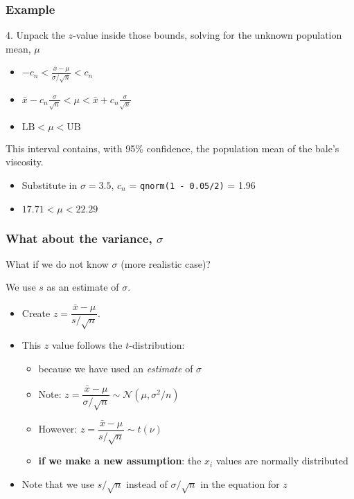 \begin{frame}\frametitle{Example}
	4. Unpack the $z$-value inside those bounds, solving for the unknown population mean, $\mu$
	\begin{itemize}
		\item	$\displaystyle - c_n < \frac{\bar{x} - \mu}{\sigma / \sqrt{n}} < c_n$ 
		\item	$\displaystyle \bar{x} - c_n\frac{\sigma}{\sqrt{n}} < \mu < \bar{x} + c_n\frac{\sigma}{\sqrt{n}}$ 
		\item	$\displaystyle \text{LB} < \mu < \text{UB}$
	\end{itemize}

	This interval contains, with 95\% confidence, the population mean of the bale's viscosity.
	\begin{itemize}
		\item	Substitute in $\sigma = 3.5$, $c_n$ = \texttt{qnorm(1 - 0.05/2)} = 1.96
		\item	$17.71 < \mu < 22.29$
	\end{itemize}
\end{frame}

\begin{frame}\frametitle{What about the variance, $\sigma$}

	What if we do not know $\sigma$ (more realistic case)?

	We use $s$ as an estimate of $\sigma$.
	\begin{itemize}
		\item	Create $z = \dfrac{\bar{x} - \mu}{s/\sqrt{n}}$.
		\item	This $z$ value follows the $t$-distribution:
		\begin{itemize}
			\item	because we have used an \emph{estimate} of $\sigma$
			\vspace{6pt}
			\item	Note: $z = \dfrac{\bar{x} - \mu}{\sigma/\sqrt{n}} \sim \mathcal{N}(\mu, \sigma^2/n)$
			\vspace{6pt}
			\item	However: $z = \dfrac{\bar{x} - \mu}{s/\sqrt{n}} \sim t\left(\nu\right)$
			\vspace{6pt}
			\item	\textbf{if we make a new assumption}: the $x_i$ values are normally distributed
		\end{itemize}
		\item	Note that we use $s/\sqrt{n}$ instead of $\sigma/\sqrt{n}$ in the equation for $z$
	\end{itemize}
\end{frame}

